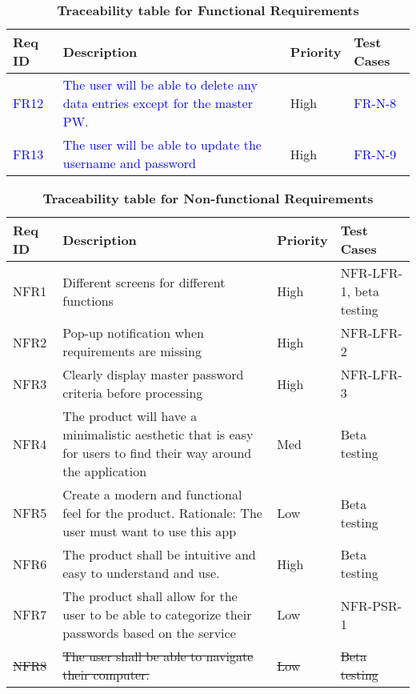 \documentclass[12pt, titlepage]{article}
\begin{document}
\begin{table}[!htbp]
    \caption{\textbf{Traceability table for Functional Requirements}} \label{5Table}
    \begin{tabularx}{\textwidth}{p{2cm}Xp{2cm}X}
        \toprule
        \textbf{Req ID} & \textbf{Description} & \textbf{Priority} & \textbf{Test Cases}\\
        \midrule
        \textcolor{blue}{FR12}  & \textcolor{blue}{The user will be able to delete any data entries except for the master PW.} & High & \textcolor{blue}{FR-N-8}\\\hline
        \textcolor{blue}{FR13} & \textcolor{blue}{The user will be able to update the username and password} & High & \textcolor{blue}{FR-N-9}\\
    
        \bottomrule
    \end{tabularx}
\end{table}

\begin{table}[!htbp]
    \caption{\textbf{Traceability table for Non-functional Requirements}} \label{Table}
    \small
    \begin{tabularx}{\textwidth}{p{2cm}Xp{2cm}X}
        \toprule
        \textbf{Req ID} & \textbf{Description} & \textbf{Priority} & \textbf{Test Cases}\\
        \midrule
        
        NFR1  & Different screens for different functions & High & NFR-LFR-1, beta testing\\\hline
        NFR2  & Pop-up notification when requirements are missing & High & NFR-LFR-2\\\hline
        NFR3  & Clearly display master password criteria before processing & High & NFR-LFR-3\\\hline      
        NFR4  & The product will have a minimalistic aesthetic that is easy for users to find their way around the application & Med & Beta testing\\\hline
        NFR5  & Create a modern and functional feel for the product. Rationale: The user must want to use this app & Low & Beta testing\\\hline
        NFR6  & The product shall be intuitive and easy to understand and use. & High & Beta testing\\\hline
        NFR7  & The product shall allow for the user to be able to categorize their passwords based on the service & Low & NFR-PSR-1\\\hline
        \sout{NFR8}  & \sout{The user shall be able to navigate their computer.} & \sout{Low} & \sout{Beta testing}\\
        
        \midrule 
    \end{tabularx}
\end{table}
\end{document}
